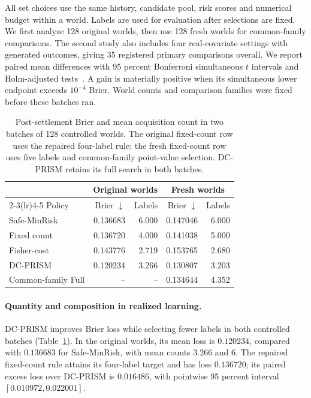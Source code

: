 \documentclass[runningheads]{llncs}
\begin{document}
All set choices use the same history, candidate pool, risk scores and numerical budget within a world. Labels are used for evaluation after selections are fixed. We first analyze 128 original worlds, then use 128 fresh worlds for common-family comparisons. The second study also includes four real-covariate settings with generated outcomes, giving 35 registered primary comparisons overall. We report paired mean differences with 95 percent Bonferroni simultaneous $t$ intervals and Holm-adjusted tests~\cite{holm1979simple}. A gain is materially positive when its simultaneous lower endpoint exceeds $10^{-4}$ Brier. World counts and comparison families were fixed before these batches ran.

\begin{table}[t]
\caption{Post-settlement Brier and mean acquisition count in two batches of 128 controlled worlds. The original fixed-count row uses the repaired four-label rule; the fresh fixed-count row uses five labels and common-family point-value selection. DC-PRISM retains its full search in both batches.}
\label{tab:controlled}
\centering
\small
\begin{tabular}{lrrrr}
\toprule
& \multicolumn{2}{c}{Original worlds} & \multicolumn{2}{c}{Fresh worlds} \\
\cmidrule(lr){2-3}\cmidrule(lr){4-5}
Policy & Brier $\downarrow$ & Labels & Brier $\downarrow$ & Labels \\
\midrule
Safe-MinRisk & 0.136683 & 6.000 & 0.147046 & 6.000 \\
Fixed count & 0.136720 & 4.000 & 0.141038 & 5.000 \\
Fisher-cost & 0.143776 & 2.719 & 0.153765 & 2.680 \\
DC-PRISM & 0.120234 & 3.266 & 0.130807 & 3.203 \\
Common-family Full & -- & -- & 0.134644 & 4.352 \\
\bottomrule
\end{tabular}
\end{table}


\paragraph{Quantity and composition in realized learning.}
DC-PRISM improves Brier loss while selecting fewer labels in both controlled batches (Table~\ref{tab:controlled}). In the original worlds, its mean loss is $0.120234$, compared with $0.136683$ for Safe-MinRisk, with mean counts $3.266$ and $6$. The repaired fixed-count rule attains its four-label target and has loss $0.136720$; its paired excess loss over DC-PRISM is $0.016486$, with pointwise 95 percent interval $[0.010972,0.022001]$.
\end{document}
